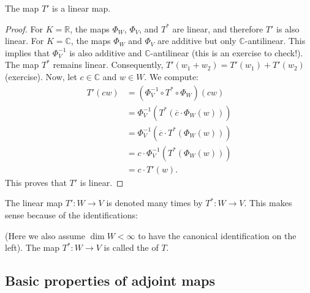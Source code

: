 \begin{claim*}
The map $T'$ is a linear map.
\end{claim*}

\begin{proof}
For $K = \mathbb{R}$, the maps $\Phi_W$, $\Phi_V$, and $T^*$ are linear, and therefore $T'$ is also linear.
For $K = \mathbb{C}$, the maps $\Phi_W$ and $\Phi_V$ are additive but only $\mathbb{C}$-antilinear. This implies that $\Phi_V^{-1}$ is also additive and $\mathbb{C}$-antilinear (this is an exercise to check!).
The map $T^*$ remains linear.
Consequently, $T'(w_1 + w_2) = T'(w_1) + T'(w_2)$ (exercise).\label{exc:additivity_T_prime}
Now, let $c \in \mathbb{C}$ and $w \in W$. We compute:
\begin{align*}
    T'(cw) &= (\Phi_V^{-1} \circ T^* \circ \Phi_W)(cw) \\
    &= \Phi_V^{-1}(T^*(\overline{c} \cdot \Phi_W(w))) \\
    &= \Phi_V^{-1}(\overline{c} \cdot T^*(\Phi_W(w))) \\
    &= c \cdot \Phi_V^{-1}(T^*(\Phi_W(w))) \\
    &= c \cdot T'(w).
\end{align*}
This proves that $T'$ is linear.
\end{proof}

\begin{notation}
The linear map $T' \colon W \to V$ is denoted many times by $T^* \colon W \to V$. This makes sense because of the  identifications:
\begin{center}
\end{center}
(Here we also assume $\dim W < \infty$ to have the canonical identification on the left). The map $T^* \colon W \to V$ is called the  of $T$.
\end{notation}

\subsection*{Basic properties of adjoint maps}

